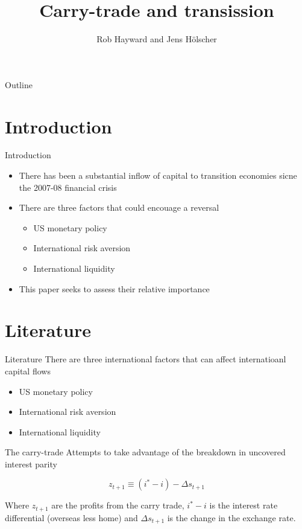 \documentclass[14pt,xcolor=pdftex,dvipsnames,table, handout]{beamer}
\title{Carry-trade and transission}
\author{Rob Hayward and Jens H\"{o}lscher}
\begin{document}
\begin{frame}
\titlepage
\end{frame}

\begin{frame}{Outline}
\tableofcontents
\end{frame}

\section{Introduction}
\begin{frame}{Introduction}
\begin{itemize}[<+-| alert@+>]
\item There has been a substantial inflow of capital to transition economies sicne the 2007-08 financial crisis
\item There are three factors that could encouage a reversal
\begin{itemize}[<+-| alert@+>]
\item US monetary policy
\item International risk aversion
\item International liquidity
\end{itemize}
\item This paper seeks to assess their relative importance
\end{itemize}
\end{frame}



\section{Literature}
\begin{frame}{Literature}
There are three international factors that can affect internatioanl capital flows
\begin{itemize}[<+-| alert@+>]
\item US monetary policy
\item International risk aversion
\item International liquidity
\end{itemize}
\end{frame}

\begin{frame}{The carry-trade}
Attempts to take advantage of the breakdown in uncovered interest parity
\begin{block}{}
\begin{equation}\label{eqref:carry}
z_{t+1} \equiv (i^* - i) -\Delta s_{t+1}
\end{equation}
\pause
\end{block}
Where $z_{t+1}$ are the profits from the carry trade, $i^* - i$ is the interest rate differential (overseas less home) and $\Delta s_{t+1}$ is the change in the exchange rate.    
\end{frame}
\end{document}
